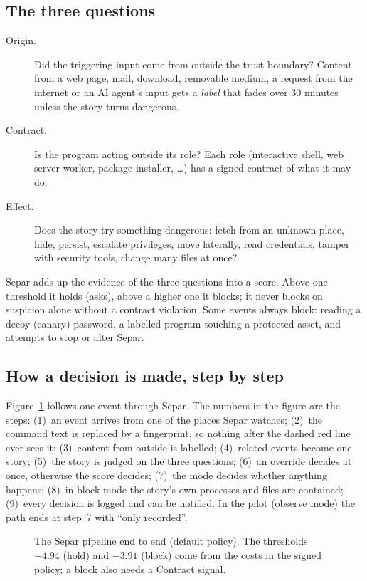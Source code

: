 \documentclass[11pt,a4paper]{article}
\begin{document}
\subsection{The three questions}
\begin{description}
  \item[Origin.] Did the triggering input come from outside the trust boundary? Content from a web
    page, mail, download, removable medium, a request from the internet or an AI agent's input gets
    a \emph{label} that fades over 30 minutes unless the story turns dangerous.
  \item[Contract.] Is the program acting outside its role? Each role (interactive shell, web server
    worker, package installer, \ldots) has a signed contract of what it may do.
  \item[Effect.] Does the story try something dangerous: fetch from an unknown place, hide, persist,
    escalate privileges, move laterally, read credentials, tamper with security tools, change many
    files at once?
\end{description}
Separ adds up the evidence of the three questions into a score. Above one threshold it holds (asks),
above a higher one it blocks; it never blocks on suspicion alone without a contract violation.
Some events always block: reading a decoy (canary) password, a labelled program touching a
protected asset, and attempts to stop or alter Separ.

\subsection{How a decision is made, step by step}
\label{sec:flow}
Figure~\ref{fig:flow} follows one event through Separ. The numbers in the figure are the steps:
(1)~an event arrives from one of the places Separ watches; (2)~the command text is replaced by a
fingerprint, so nothing after the dashed red line ever sees it; (3)~content from outside is
labelled; (4)~related events become one story; (5)~the story is judged on the three questions;
(6)~an override decides at once, otherwise the score decides; (7)~the mode decides whether
anything happens; (8)~in block mode the story's own processes and files are contained; (9)~every
decision is logged and can be notified. In the pilot (observe mode) the path ends at step~7 with
``only recorded''.

\begin{figure}[!htbp]
  \centering
  \caption{The Separ pipeline end to end (default policy). The thresholds $-4.94$ (hold) and
  $-3.91$ (block) come from the costs in the signed policy; a block also needs a Contract
  signal.}
  \label{fig:flow}
\end{figure}
\end{document}
